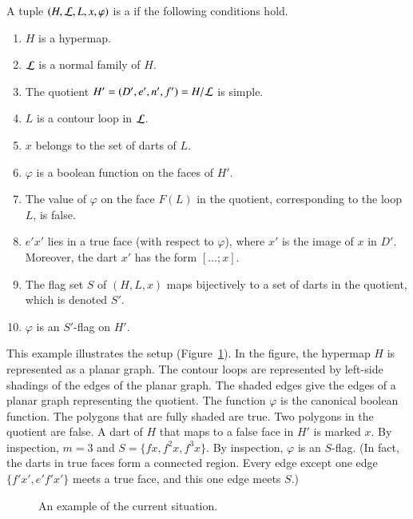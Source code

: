 \begin{definition}\label{def:marked}
  A tuple $(H,{\cal L},L,x,\varphi)$ is a  if
  the following conditions hold.
\begin{enumerate}
\item $H$ is a hypermap.
\item $\cal L$ is a normal family of $H$.
\item The quotient $H'=(D',e',n',f')=H/{\cal L}$ is simple.  
\item $L$ is a contour loop in ${\cal L}$.
\item $x$ belongs to the set of darts of $L$.
\item $\varphi$ is a boolean function on the faces of $H'$.
\item The value of $\varphi$ on the face $F(L)$
in the quotient, corresponding to the loop $L$, is false.
\item   $e'x'$ lies in
a true face (with respect to $\varphi$), where $x'$ is the image
of $x$ in $D'$. Moreover, the dart $x'$ has the form $[\ldots;x]$.
\item The flag set $S$ of $(H,L,x)$ maps bijectively to a set
of darts in the quotient, which is denoted $S'$.
\item  $\varphi$ is an $S'$-flag on $H'$.
\end{enumerate}
\end{definition}




\begin{example}\label{ex:graph-gen}  
This example illustrates the setup
(Figure~\ref{fig:graph-gen}).  In the figure, the hypermap $H$ is
represented as a planar graph.  The contour loops are represented by
left-side shadings of the edges of the planar graph.  The shaded
edges give the edges of a planar graph representing the quotient.
The function $\varphi$ is the canonical boolean function.
The polygons that are fully shaded are true.  Two polygons in the
quotient are false.  A dart of $H$ that maps to a false face in $H'$ is marked $x$.
By inspection, $m=3$ and $S=\{f x,f^2 x,f^3 x\}$.  By inspection,
$\varphi$ is an $S$-flag.  (In fact, the darts
in true faces form a connected region.  Every edge except one edge
$\{f' x', e' f' x'\}$ meets a true face, and this one edge meets $S$.)
\end{example}

\begin{figure}[htb]
\centering
{}
\caption{An example of the current situation.}
\label{fig:graph-gen}
\end{figure}



